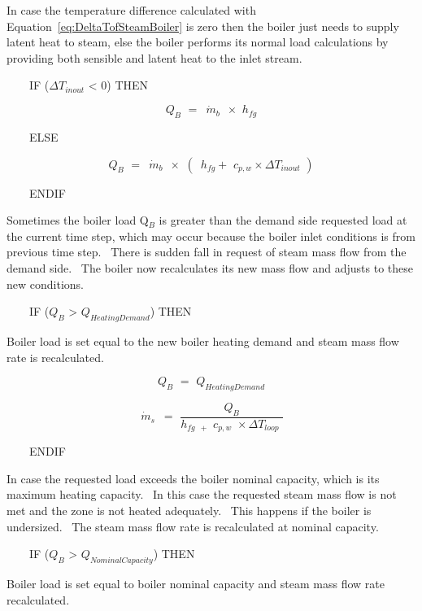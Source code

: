 In case the temperature difference calculated with Equation~\ref{eq:DeltaTofSteamBoiler} is zero then the boiler just needs to supply latent heat to steam, else the boiler performs its normal load calculations by providing both sensible and latent heat to the inlet stream.

~~~~IF (\(\Delta {T_{inout}}\) < 0) THEN

\begin{equation}
{Q_B}\,\, = \,\,\,{\dot m_b}\,\,\, \times \,\,{h_{fg}}
\end{equation}

~~~~ELSE

\begin{equation}
{Q_B}\,\, = \,\,\,{\dot m_b}\,\,\, \times \,\,(\,\,\,{h_{fg}} + \,\,{c_{p,w}} \times \Delta {T_{inout}}\,\,)
\end{equation}

~~~~ENDIF

Sometimes the boiler load Q\(_{B}\) is greater than the demand side requested load at the current time step, which may occur because the boiler inlet conditions is from previous time step.~ There is sudden fall in request of steam mass flow from the demand side.~ The boiler now recalculates its new mass flow and adjusts to these new conditions.

~~~~IF (\({Q_B}\) > \({Q_{HeatingDemand}}\)) THEN

Boiler load is set equal to the new boiler heating demand and steam mass flow rate is recalculated.

\begin{equation}
{Q_B}\,\, = \,\,{Q_{HeatingDemand}}
\end{equation}

\begin{equation}
\,{\dot m_s}\,\,\, = \,\,\frac{{{Q_B}}}{{{h_{fg\,\,\, + }}\,\,{c_{p,w}}\,\, \times \Delta {T_{loop}}\,\,}}
\end{equation}

~~~~ENDIF

In case the requested load exceeds the boiler nominal capacity, which is its maximum heating capacity.~ In this case the requested steam mass flow is not met and the zone is not heated adequately.~ This happens if the boiler is undersized.~ The steam mass flow rate is recalculated at nominal capacity.

~~~~IF (\({Q_B}\) > \({Q_{NominalCapacity}}\)) THEN

Boiler load is set equal to boiler nominal capacity and steam mass flow rate recalculated.

